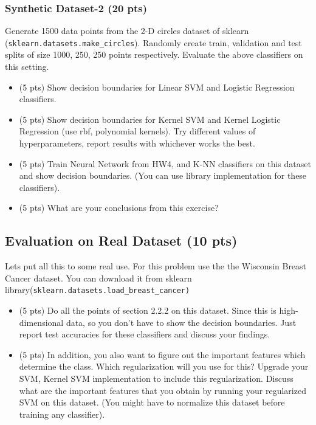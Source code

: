 \documentclass[a4paper]{article}
\theoremstyle{definition}
\begin{document}
 \subsubsection{Synthetic Dataset-2  (20 pts) }
 Generate 1500 data points from the 2-D circles dataset of sklearn (\texttt{sklearn.datasets.make\_circles}). Randomly create train, validation and test splits of size 1000, 250, 250 points respectively. Evaluate the above classifiers on this setting.
 \begin{itemize}
     \item (5 pts) Show decision boundaries for Linear SVM and Logistic Regression classifiers. 
     \item (5 pts) Show decision boundaries for Kernel SVM and Kernel Logistic Regression (use rbf, polynomial kernels). Try different values of hyperparameters, report results with whichever works the best.
     \item (5 pts) Train Neural Network from HW4, and K-NN classifiers on this dataset and show decision boundaries. (You can use library implementation for these classifiers).
     \item (5 pts) What are your conclusions from this exercise?
 \end{itemize}
 
 \subsection{Evaluation on Real Dataset (10 pts)}
 Lets put all this to some real use. For this problem use the the Wisconsin Breast Cancer dataset. You can download it from sklearn library(\texttt{sklearn.datasets.load\_breast\_cancer)
}
\begin{itemize}
    \item (5 pts) Do all the points of section 2.2.2 on this dataset. Since this is high-dimensional data, so you don't have to show the decision boundaries. Just report test accuracies for these classifiers and discuss your findings. 
    
    \item (5 pts) In addition, you also want to figure out the  important features which determine the class. Which regularization will you use for this? Upgrade your SVM, Kernel SVM implementation to include this regularization. Discuss what are the important features that you obtain by running your regularized SVM on this dataset. (You might have to normalize this dataset before training any classifier).
\end{itemize}
\end{document}
